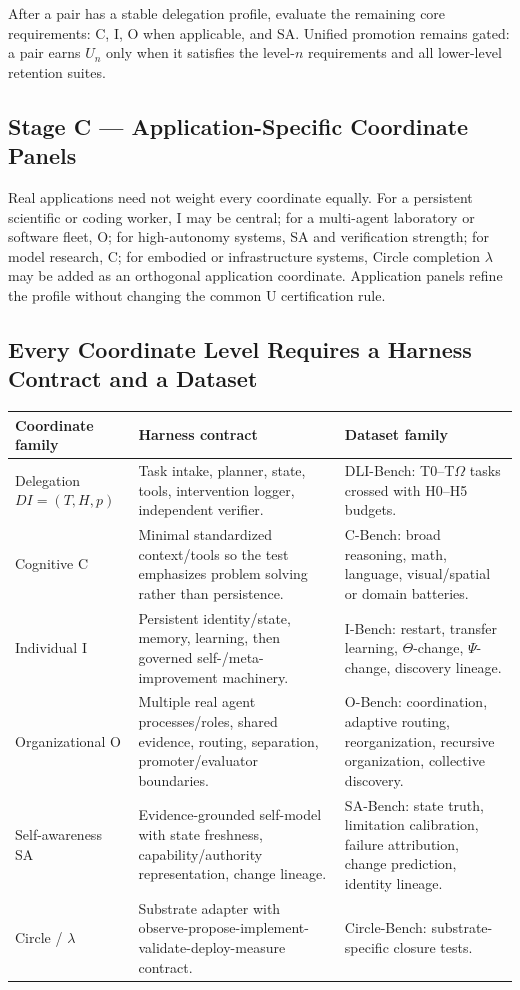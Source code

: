 \documentclass[11pt]{article}
\theoremstyle{definition}
\newcommand{\Om}{\ensuremath{\Omega}}
\begin{document}
After a pair has a stable delegation profile, evaluate the remaining core requirements: C, I, O when applicable, and SA. Unified promotion remains gated: a pair earns $U_n$ only when it satisfies the level-$n$ requirements and all lower-level retention suites.

\subsection{Stage C --- Application-Specific Coordinate Panels}

Real applications need not weight every coordinate equally. For a persistent scientific or coding worker, I may be central; for a multi-agent laboratory or software fleet, O; for high-autonomy systems, SA and verification strength; for model research, C; for embodied or infrastructure systems, Circle completion $\lambda$ may be added as an orthogonal application coordinate. Application panels refine the profile without changing the common U certification rule.

\subsection{Every Coordinate Level Requires a Harness Contract and a Dataset}

\begin{table}[h]
\centering\small
\begin{tabularx}{\textwidth}{@{}lYY@{}}
\toprule
Coordinate family & Harness contract & Dataset family \\
\midrule
Delegation $DI=(T,H,p)$ & Task intake, planner, state, tools, intervention logger, independent verifier. & DLI-Bench: T0--T\Om{} tasks crossed with H0--H5 budgets. \\
Cognitive C & Minimal standardized context/tools so the test emphasizes problem solving rather than persistence. & C-Bench: broad reasoning, math, language, visual/spatial or domain batteries. \\
Individual I & Persistent identity/state, memory, learning, then governed self-/meta-improvement machinery. & I-Bench: restart, transfer learning, $\Theta$-change, $\Psi$-change, discovery lineage. \\
Organizational O & Multiple real agent processes/roles, shared evidence, routing, separation, promoter/evaluator boundaries. & O-Bench: coordination, adaptive routing, reorganization, recursive organization, collective discovery. \\
Self-awareness SA & Evidence-grounded self-model with state freshness, capability/authority representation, change lineage. & SA-Bench: state truth, limitation calibration, failure attribution, change prediction, identity lineage. \\
Circle / $\lambda$ & Substrate adapter with observe-propose-implement-validate-deploy-measure contract. & Circle-Bench: substrate-specific closure tests. \\
\bottomrule
\end{tabularx}
\end{table}
\end{document}
